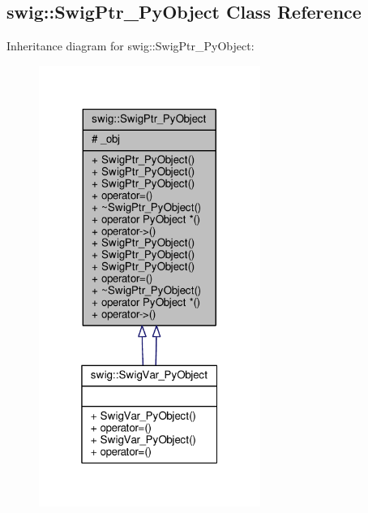 \subsection{swig\+:\+:Swig\+Ptr\+\_\+\+Py\+Object Class Reference}
\label{classswig_1_1SwigPtr__PyObject}


Inheritance diagram for swig\+:\+:Swig\+Ptr\+\_\+\+Py\+Object\+:
\nopagebreak
\begin{figure}[H]
\begin{center}
\leavevmode
\includegraphics[width=205pt]{d7/da0/classswig_1_1SwigPtr__PyObject__inherit__graph}
\end{center}
\end{figure}


